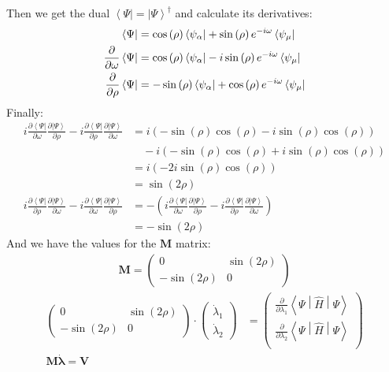 \documentclass{aux/ttuthes2007}
\newcommand{\bra}[1]{\ensuremath{\left\langle#1\right\vert}}
\newcommand{\ket}[1]{\ensuremath{\left|#1\right\rangle}}
\newcommand{\sandwich}[3]{\left< #1 \middle\vert #2 \middle\vert #3 \right>}
\newcommand{\s}[1]{\sin\left( #1 \right)}
\newcommand{\co}[1]{\cos\left( #1 \right)}
\newcommand{\paren}[1]{\left( #1 \right)}
\newcommand{\pd}[1]{\frac{\partial}{\partial #1}}
\newcommand{\kpp}[1]{\frac{\partial \ket\Psi}{\partial #1}}
\newcommand{\bpp}[1]{\frac{\partial \bra\Psi}{\partial #1}}
\newcommand{\uo}[1]{
		\IfEqCase{#1}{
			{0}{\mu}
			{1}{\nu}
			{2}{\xi}
		}[\PackageError{uo}{Undefined option to uo: #1}{}]
}
\newcommand{\oo}[1]{
		\IfEqCase{#1}{
			{0}{\alpha}
			{1}{\beta}
			{2}{\gamma}
		}[\PackageError{unocorb}{Undefined option to unuo: #1}{}]
}
\begin{document}
Then we get the dual $\bra\Psi = {\ket\Psi}^\dagger$ and calculate its derivatives:
\begin{equation*}
	\begin{split}
		\bra{\Psi} 
		&= \co{\rho}\bra{\psi_{\oo {0}}} + \s\rho e^{-i\omega}\bra{\psi_{\uo {0}}}
		\\
		\pd\omega\bra\Psi 
		&= \co\rho\bra{\psi_{\oo {0}}} - i\s\rho e^{-i\omega}\bra{\psi_{\uo {0}}}
		\\
		\pd\rho\bra\Psi 
		&= -\s\rho\bra{\psi_{\oo {0}}} + \co\rho e^{-i\omega}\bra{\psi_{\uo {0}}}
	\end{split}
\end{equation*}
%
Finally:
%
\begin{equation*}
	\begin{split}
	i \bpp{\omega} \kpp{\rho} - i \bpp{\rho} \kpp{\omega} 
	&= 
	i\paren{-\s\rho\co\rho - i\s\rho\co\rho} \\
	&\quad 
	-i\paren{-\s\rho\co\rho + i\s\rho\co\rho} \\
	&=
	i\paren{-2i\s\rho\co\rho} \\
	&=
	\s{2\rho}
	\\
	i \bpp{\rho} \kpp{\omega} - i \bpp{\omega} \kpp{\rho} 
	&= 
	- \paren{i \bpp{\omega} \kpp{\rho} - i \bpp{\rho} \kpp{\omega}} \\
	&=
	-\s{2\rho}
	\end{split}
\end{equation*}
%
And we have the values for the $\bm M$ matrix:
%
\begin{equation*}
	\begin{split}
		\bm M = 
	\begin{pmatrix}
		0 & \s{2\rho} \\
		-\s{2\rho} & 0
	\end{pmatrix} 
	\end{split}
\end{equation*}
\begin{equation*}
	\begin{split}
	\begin{pmatrix}
		0 & \s{2\rho} \\
		-\s{2\rho} & 0
	\end{pmatrix} 
	\cdot
	\begin{pmatrix}
		\dot \lambda_1 \\
		\dot \lambda_2 
	\end{pmatrix} 
	    &=
	\begin{pmatrix}
		\pd {\lambda_1} \sandwich{\Psi}{\hat H}{\Psi}\\
		\pd {\lambda_2} \sandwich{\Psi}{\hat H}{\Psi}\\
	\end{pmatrix} \\
	\bm M \dot {\bm \lambda} = \bm V
	\end{split}
\end{equation*}
%
\end{document}
